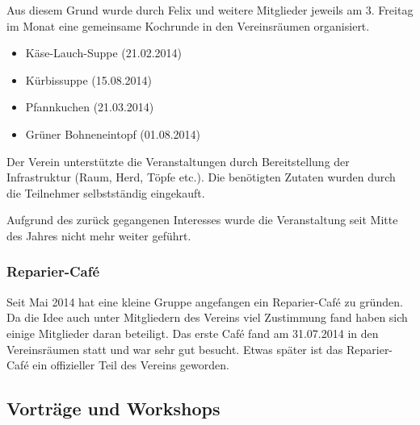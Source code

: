 \documentclass[ngerman,10pt,DIV16]{scrartcl}
\begin{document}
Aus diesem Grund wurde durch Felix und weitere Mitglieder jeweils am 3. Freitag
im Monat eine gemeinsame Kochrunde in den Vereinsräumen organisiert.

\begin{itemize}
    \item Käse-Lauch-Suppe (21.02.2014)
    \item Kürbissuppe (15.08.2014)
    \item Pfannkuchen (21.03.2014)
    \item Grüner Bohneneintopf (01.08.2014)
\end{itemize}

Der Verein unterstützte die Veranstaltungen durch Bereitstellung der
Infrastruktur (Raum, Herd, Töpfe etc.). Die benötigten Zutaten wurden
durch die Teilnehmer selbstständig eingekauft. 

Aufgrund des zurück gegangenen Interesses wurde die Veranstaltung seit Mitte des Jahres nicht mehr weiter geführt. 

\subsubsection{Reparier-Café}

Seit Mai 2014 hat eine kleine Gruppe angefangen ein Reparier-Café zu gründen. 
Da die Idee auch unter Mitgliedern des Vereins viel Zustimmung fand haben sich einige Mitglieder daran beteiligt. 
Das erste Café fand am 31.07.2014 in den Vereinsräumen statt und war sehr gut besucht. 
Etwas später ist das Reparier-Café ein offizieller Teil des Vereins geworden. 


\subsection{Vorträge und Workshops}
\end{document}
